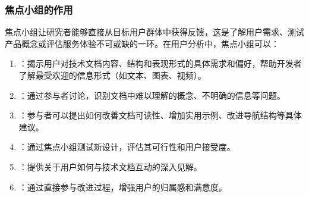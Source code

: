 \documentclass[letterpaper,10pt,english]{sphinxmanual}
\begin{document}
\subsubsection{焦点小组的作用}
\label{\detokenize{user-research/focus-group:id8}}
\sphinxAtStartPar
焦点小组让研究者能够直接从目标用户群体中获得反馈，这是了解用户需求、测试产品概念或评估服务体验不可或缺的一环。在用户分析中，焦点小组可以：
\begin{enumerate}
%
\item {} 
\sphinxAtStartPar
{}：揭示用户对技术文档内容、结构和表现形式的具体需求和偏好，帮助开发者了解最受欢迎的信息形式（如文本、图表、视频）。

\item {} 
\sphinxAtStartPar
{}：通过参与者讨论，识别文档中难以理解的概念、不明确的信息等问题。

\item {} 
\sphinxAtStartPar
{}：参与者可以提出如何改善文档可读性、增加实用示例、改进导航结构等具体建议。

\item {} 
\sphinxAtStartPar
{}：通过焦点小组测试新设计，评估其可行性和用户接受度。

\item {} 
\sphinxAtStartPar
{}：提供关于用户如何与技术文档互动的深入见解。

\item {} 
\sphinxAtStartPar
{}：通过直接参与改进过程，增强用户的归属感和满意度。

\end{enumerate}
\end{document}
